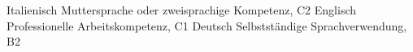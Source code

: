
\begin{cvskills}

\cvskill
{Italienisch}
{Muttersprache oder zweisprachige Kompetenz, C2}
\cvskill
{Englisch}
{Professionelle Arbeitskompetenz, C1}
\cvskill
{Deutsch}
{Selbstständige Sprachverwendung, B2}
\end{cvskills}